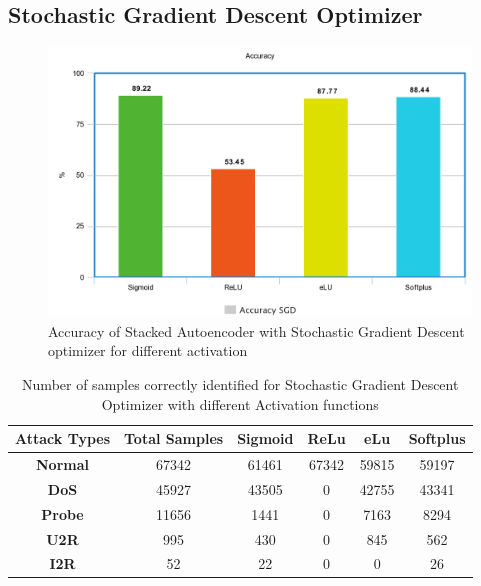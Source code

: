 \documentclass[12pt, a4paper]{report}
\begin{document}
\begin{appendices}
	\section {Stochastic Gradient Descent Optimizer}
	 \begin{figure}[ht]
\centering
\captionsetup{justification=centering,margin=2cm}
\includegraphics[width=13cm]{accuracy_sgd_tflearn.png}
\caption{ Accuracy of Stacked Autoencoder with Stochastic Gradient Descent optimizer for different activation }
\label{fig:acc_sgd}
\end{figure}
\begin{table}[h]
\centering
\captionsetup{justification=centering,margin=2cm}
\begin{tabular}{|c|c|c|c|c|c|}
\hline
\textbf{Attack Types} & \textbf{Total Samples} & \textbf{Sigmoid} & \textbf{ReLu} & \textbf{eLu} & \textbf{Softplus} \\ \hline
\textbf{Normal}       & 67342                  & 61461            & 67342         & 59815        & 59197             \\ \hline
\textbf{DoS}          & 45927                  & 43505            & 0         & 42755        & 43341             \\ \hline
\textbf{Probe}        & 11656                  & 1441             & 0          & 7163         & 8294              \\ \hline
\textbf{U2R}          & 995                    & 430              & 0           & 845          & 562               \\ \hline
\textbf{I2R}          & 52                     & 22               & 0            & 0           & 26                \\ \hline
\end{tabular}
\caption{Number of samples correctly identified for Stochastic Gradient Descent Optimizer with different Activation functions}
\label{confusion_sgd}
\end{table}
\clearpage

\end{appendices}
\end{document}
